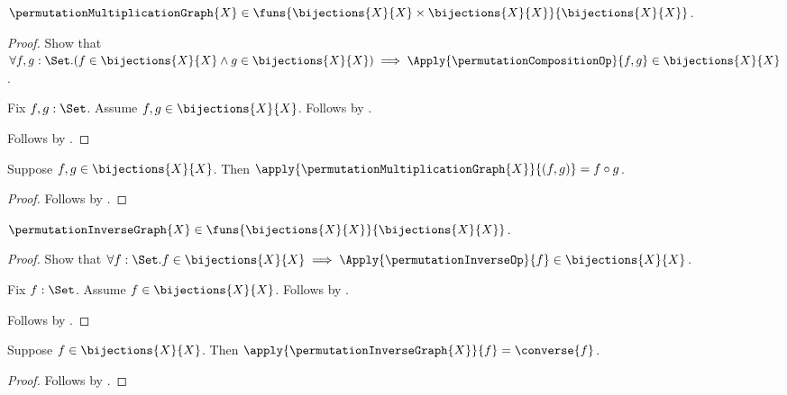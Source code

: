 \begin{proposition}\label{permutation_multiplication_graph_type}
    $\permutationMultiplicationGraph{X}\in
        \funs{\bijections{X}{X}\times\bijections{X}{X}}
            {\bijections{X}{X}}$.
\end{proposition}
\begin{proof}
    Show that $\forall f,g:\Set.
        (f\in\bijections{X}{X}\land g\in\bijections{X}{X})
        \implies
        \Apply{\permutationCompositionOp}{f,g}
            \in\bijections{X}{X}$.
    \begin{subproof}
        Fix $f,g:\Set$.
        Assume $f,g\in\bijections{X}{X}$.
        Follows by
            .
    \end{subproof}
    Follows by
        .
\end{proof}

\begin{proposition}\label{permutation_multiplication_graph_apply}
    Suppose $f,g\in\bijections{X}{X}$.
    Then
        $\apply{\permutationMultiplicationGraph{X}}{(f,g)}=f\circ g$.
\end{proposition}
\begin{proof}
    Follows by
        .
\end{proof}

\begin{proposition}\label{permutation_inverse_graph_type}
    $\permutationInverseGraph{X}\in
        \funs{\bijections{X}{X}}{\bijections{X}{X}}$.
\end{proposition}
\begin{proof}
    Show that $\forall f:\Set.
        f\in\bijections{X}{X}\implies
        \Apply{\permutationInverseOp}{f}\in\bijections{X}{X}$.
    \begin{subproof}
        Fix $f:\Set$.
        Assume $f\in\bijections{X}{X}$.
        Follows by
            .
    \end{subproof}
    Follows by
        .
\end{proof}

\begin{proposition}\label{permutation_inverse_graph_apply}
    Suppose $f\in\bijections{X}{X}$.
    Then $\apply{\permutationInverseGraph{X}}{f}=\converse{f}$.
\end{proposition}
\begin{proof}
    Follows by
        .
\end{proof}

